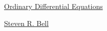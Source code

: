 \documentclass[11pt]{article}
\begin{document}
	\kaishu 
	\setcounter{section}{0}
	\begin{center}
		{\LARGE  \href{https://www.math.purdue.edu/~bell/MA366/}{Ordinary Differential Equations}}
		
		
		{\large \href{https://www.math.purdue.edu/~bell/}{Steven R. Bell}}
	\end{center}
\setcounter{page}{1}



\vspace{-1cm}
\end{document}
